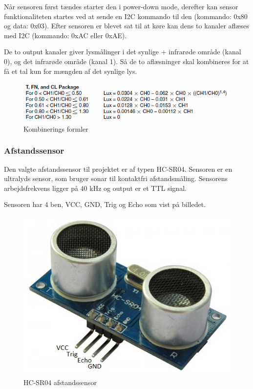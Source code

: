 Når sensoren først tændes starter den i power-down mode, derefter kan sensor funktionaliteten startes ved at sende en I2C kommando til den (kommando: 0x80 og data: 0x03). Efter sensoren er blevet sat til at køre kan dens to kanaler aflæses med I2C (kommando: 0xAC eller 0xAE).

De to output kanaler giver lysmålinger i det synlige + infrarøde område (kanal 0), og det infrarøde område (kanal 1). Så de to aflæsninger skal kombineres  for at få et tal kun for mængden af det synlige lys.

\begin{figure}[H] \centering
    \includegraphics{0_Filer/Figuer/5_HW_Design/Kombinerings_formler.png}
    \caption{Kombinerings formler}
    \label{fig:HWD_Lumen_formler}
\end{figure}

\subsubsection{Afstandssensor}

Den valgte afstandssensor til projektet er af typen HC-SR04. Sensoren er en ultralyds sensor, som bruger sonar til kontaktfri afstandsmåling. Sensorens arbejdsfrekvens ligger på 40 kHz og output er et TTL signal.

Sensoren har 4 ben, VCC, GND, Trig og Echo som vist på billedet.

\begin{figure}[H] \centering
    \includegraphics{0_Filer/Figuer/5_HW_Design/HC-SR04.jpg}
    \caption{HC-SR04 afstandssensor}
    \label{fig:HWD_SR04}
\end{figure}

